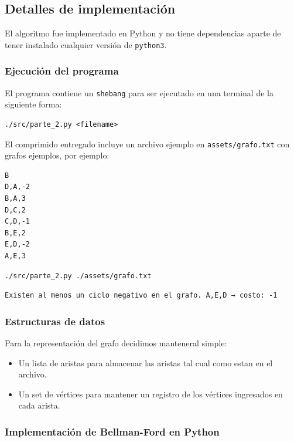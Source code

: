 \documentclass[titlepage,a4paper]{article}
\begin{document}
\subsection{Detalles de implementación}
\label{sec:org6b3b0ad}

El algoritmo fue implementado en Python y no tiene dependencias aparte de tener
instalado cualquier versión de \texttt{python3}.

\subsubsection{Ejecución del programa}
\label{sec:org20b1321}

El programa contiene un \texttt{shebang} para ser ejecutado en una terminal de la
siguiente forma:

\begin{verbatim}
./src/parte_2.py <filename>
\end{verbatim}

El comprimido entregado incluye un archivo ejemplo en \texttt{assets/grafo.txt} con grafos ejemplos,
por ejemplo:

\begin{verbatim}
B
D,A,-2
B,A,3
D,C,2
C,D,-1
B,E,2
E,D,-2
A,E,3
\end{verbatim}

\begin{verbatim}
./src/parte_2.py ./assets/grafo.txt
\end{verbatim}

\begin{verbatim}
Existen al menos un ciclo negativo en el grafo. A,E,D → costo: -1
\end{verbatim}

\subsubsection{Estructuras de datos}
\label{sec:orgad5fdd6}

Para la representación del grafo decidimos manteneral simple:
\begin{itemize}
\item Un lista de aristas para almacenar las aristas tal cual como estan en el archivo.
\item Un set de vértices para mantener un registro de los vértices ingresados en
cada arista.
\end{itemize}

\pagebreak

\subsubsection{Implementación de Bellman-Ford en Python}
\label{sec:org98c147b}
\end{document}
